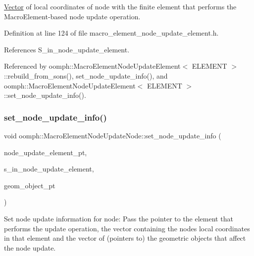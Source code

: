 \hyperlink{classoomph_1_1Vector}{Vector} of local coordinates of node with the finite element that performs the Macro\+Element-\/based node update operation. 



Definition at line 124 of file macro\+\_\+element\+\_\+node\+\_\+update\+\_\+element.\+h.



References S\+\_\+in\+\_\+node\+\_\+update\+\_\+element.



Referenced by oomph\+::\+Macro\+Element\+Node\+Update\+Element$<$ E\+L\+E\+M\+E\+N\+T $>$\+::rebuild\+\_\+from\+\_\+sons(), set\+\_\+node\+\_\+update\+\_\+info(), and oomph\+::\+Macro\+Element\+Node\+Update\+Element$<$ E\+L\+E\+M\+E\+N\+T $>$\+::set\+\_\+node\+\_\+update\+\_\+info().

\mbox{\label{classoomph_1_1MacroElementNodeUpdateNode_ac7be9a6d6970ef6ca9d0406a117ddb13}} 
\subsubsection{\texorpdfstring{set\+\_\+node\+\_\+update\+\_\+info()}{set\_node\_update\_info()}}
{\footnotesize\ttfamily void oomph\+::\+Macro\+Element\+Node\+Update\+Node\+::set\+\_\+node\+\_\+update\+\_\+info (\begin{DoxyParamCaption}\item[{\hyperlink{classoomph_1_1FiniteElement}{Finite\+Element} $\ast$}]{node\+\_\+update\+\_\+element\+\_\+pt,  }\item[{const \hyperlink{classoomph_1_1Vector}{Vector}$<$ double $>$ \&}]{s\+\_\+in\+\_\+node\+\_\+update\+\_\+element,  }\item[{const \hyperlink{classoomph_1_1Vector}{Vector}$<$ \hyperlink{classoomph_1_1GeomObject}{Geom\+Object} $\ast$$>$ \&}]{geom\+\_\+object\+\_\+pt }\end{DoxyParamCaption})\hspace{0.3cm}{\ttfamily [inline]}}



Set node update information for node\+: Pass the pointer to the element that performs the update operation, the vector containing the node\textquotesingle{}s local coordinates in that element and the vector of (pointers to) the geometric objects that affect the node update. 




